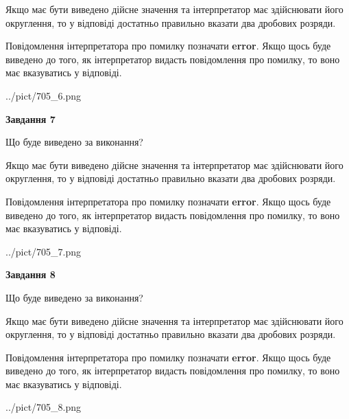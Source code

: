 \documentclass[12pt, ukrainian]{article}
\begin{document}
{\begin {Large}
Якщо має бути виведено дійсне значення та інтерпретатор має здійснювати його округлення, 
то у відповіді достатньо правильно вказати два дробових розряди.

Повідомлення інтерпретатора про помилку позначати \textbf{error}.
Якщо щось буде виведено до того, як інтерпретатор видасть повідомлення про помилку, 
то воно має вказуватись у відповіді. \par

\begin{center}
	{../pict/705_6.png}
\end{center}
\newpage

{\begin {center}\textbf{Завдання 7}\end {center}}\par
Що буде виведено за виконання? \par

Якщо має бути виведено дійсне значення та інтерпретатор має здійснювати його округлення, 
то у відповіді достатньо правильно вказати два дробових розряди.

Повідомлення інтерпретатора про помилку позначати \textbf{error}.
Якщо щось буде виведено до того, як інтерпретатор видасть повідомлення про помилку, 
то воно має вказуватись у відповіді. \par

\begin{center}
	{../pict/705_7.png}
\end{center}
\newpage

{\begin {center}\textbf{Завдання 8}\end {center}}\par
Що буде виведено за виконання? \par

Якщо має бути виведено дійсне значення та інтерпретатор має здійснювати його округлення, 
то у відповіді достатньо правильно вказати два дробових розряди.

Повідомлення інтерпретатора про помилку позначати \textbf{error}.
Якщо щось буде виведено до того, як інтерпретатор видасть повідомлення про помилку, 
то воно має вказуватись у відповіді. \par

\begin{center}
	{../pict/705_8.png}
\end{center}
\newpage


\end{Large}}
\end{document}
